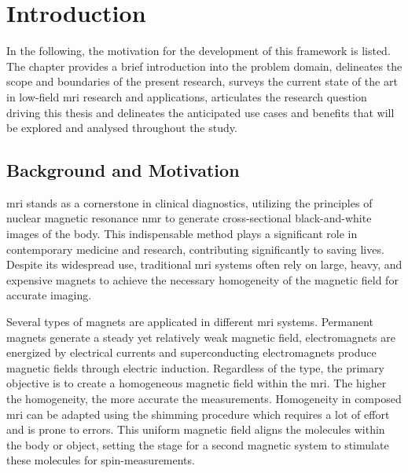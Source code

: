 \hypertarget{introduction}{%
\chapter{Introduction}\label{introduction}}

In the following, the motivation for the development of this framework
is listed. The chapter provides a brief introduction into the problem
domain, delineates the scope and boundaries of the present research,
surveys the current state of the art in low-field \gls{mri} research and
applications, articulates the research question driving this thesis and
delineates the anticipated use cases and benefits that will be explored
and analysed throughout the study.

\hypertarget{background-and-motivation}{%
\section{Background and Motivation}\label{background-and-motivation}}

\gls{mri} stands as a cornerstone in clinical diagnostics, utilizing the
principles of nuclear magnetic resonance \gls{nmr} to generate
cross-sectional black-and-white images of the body. This indispensable
method plays a significant role in contemporary medicine and research,
contributing significantly to saving lives. Despite its widespread use,
traditional \gls{mri} systems often rely on large, heavy, and expensive
magnets to achieve the necessary homogeneity of the magnetic field for
accurate imaging. 

Several types of magnets are applicated in different \gls{mri} systems.
Permanent magnets generate a steady yet relatively weak magnetic field,
electromagnets are energized by electrical currents and superconducting
electromagnets produce magnetic fields through electric induction.
Regardless of the type, the primary objective is to create a homogeneous
magnetic field within the \gls{mri}. The higher the homogeneity, the
more accurate the measurements. Homogeneity in composed \gls{mri} can be
adapted using the shimming procedure which requires a lot of effort and
is prone to errors. This uniform magnetic field aligns the molecules
within the body or object, setting the stage for a second magnetic
system to stimulate these molecules for spin-measurements.

\newpage

